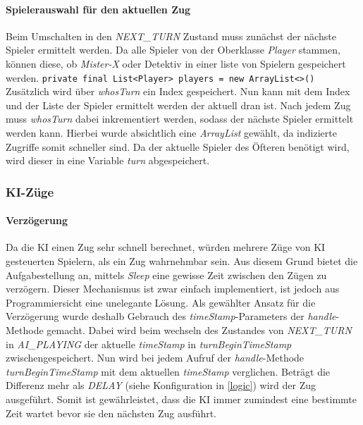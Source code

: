                 \paragraph{Spielerauswahl für den aktuellen Zug}
                    Beim Umschalten in den \textit{NEXT\_TURN} Zustand muss zunächst der nächste Spieler ermittelt werden.
                    Da alle Spieler von der Oberklasse \textit{Player} stammen, können diese, ob \textit{Mister-X} oder Detektiv in einer 
                    liste von Spielern gespeichert werden.
                    \newline
                    \newline
                    \texttt{private final List<Player> players = new ArrayList<>()}
                    \newline
                    \newline
                    Zusätzlich wird über \textit{whosTurn} ein Index gespeichert.
                    Nun kann mit dem Index und der Liste der Spieler ermittelt werden der aktuell dran ist.
                    Nach jedem Zug muss \textit{whosTurn} dabei inkrementiert werden, sodass der nächste Spieler ermittelt werden kann.
                    Hierbei wurde absichtlich eine \textit{ArrayList} gewählt, da indizierte Zugriffe somit schneller sind.
                    Da der aktuelle Spieler des Öfteren benötigt wird, wird dieser in eine Variable \textit{turn} abgespeichert.

            \subsubsection{KI-Züge}
                
                \paragraph{Verzögerung}
                    Da die KI einen Zug sehr schnell berechnet, würden mehrere Züge von KI gesteuerten Spielern,
                    als ein Zug wahrnehmbar sein. Aus diesem Grund bietet die Aufgabestellung an,
                    mittels  \textit{Sleep} eine gewisse Zeit zwischen den Zügen zu verzögern.
                    Dieser Mechanismus ist zwar einfach implementiert, ist jedoch aus Programmiersicht eine unelegante Lösung.
                    \newline
                    Als gewählter Ansatz für die Verzögerung wurde deshalb Gebrauch des \textit{timeStamp}-Parameters der \textit{handle}-Methode gemacht.
                    Dabei wird beim wechseln des Zustandes von \textit{NEXT\_TURN} in \textit{AI\_PLAYING} der aktuelle \textit{timeStamp} in \textit{turnBeginTimeStamp}
                    zwischengespeichert. 
                    Nun wird bei jedem Aufruf der \textit{handle}-Methode \textit{turnBeginTimeStamp} mit dem aktuellen \textit{timeStamp} verglichen.
                    Beträgt die Differenz mehr als \textit{DELAY} (siehe Konfiguration in \ref{logic}) wird der Zug ausgeführt.
                    Somit ist gewährleistet, dass die KI immer zumindest eine bestimmte Zeit wartet bevor sie den nächsten Zug ausführt.

